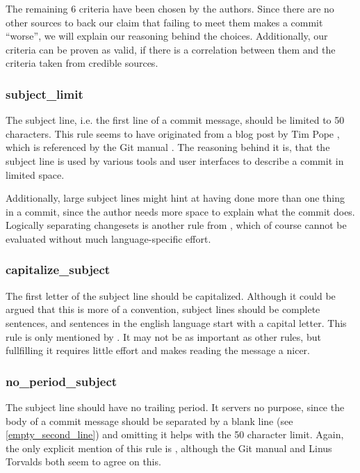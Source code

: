 The remaining 6 criteria have been chosen by the authors. Since there are no other sources to back our claim that failing to meet them makes a commit ``worse'', we will explain our reasoning behind the choices. Additionally, our criteria can be proven as valid, if there is a correlation between them and the criteria taken from credible sources. %


\subsubsection{subject\_limit}
\label{subs:subject_limit}
The subject line, i.e. the first line of a commit message, should be limited to 50 characters. This rule seems to have originated from a blog post by Tim Pope \cite{TP}, which is referenced by the Git manual \cite{OffGuide}. The reasoning behind it is, that the subject line is used by various tools and user interfaces to describe a commit in limited space.

Additionally, large subject lines might hint at having done more than one thing in a commit, since the author needs more space to explain what the commit does. Logically separating changesets is another rule from \cite{OffGuide}, which of course cannot be evaluated without much language-specific effort.

\subsubsection{capitalize\_subject}
\label{subs:capitalize_subject}
The first letter of the subject line should be capitalized. Although it could be argued that this is more of a convention, subject lines should be complete sentences, and sentences in the english language start with a capital letter. This rule is only mentioned by \cite{CB}. It may not be as important as other rules, but fullfilling it requires little effort and makes reading the message a nicer.

\subsubsection{no\_period\_subject}
\label{subs:no_period_subject}
The subject line should have no trailing period. It servers no purpose, since the body of a commit message should be separated by a blank line (see \ref{empty_second_line}) and omitting it helps with the 50 character limit. Again, the only explicit mention of this rule is \cite{CB}, although the Git manual \cite{OffGuide} and Linus Torvalds \cite{SR} both seem to agree on this.

